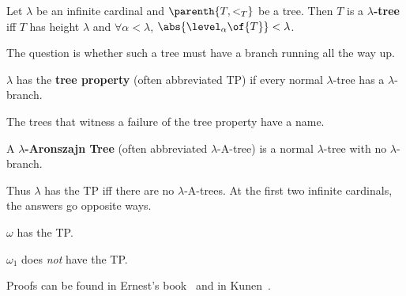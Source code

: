 

\begin{boxdefinition}
    Let $\lambda$ be an infinite cardinal and $\parenth{T, <_T}$ be a tree. Then $T$ is a \textbf{$\lambda$-tree} iff $T$ has height $\lambda$ and $\forall \alpha < \lambda$, $\abs{\level_{\alpha}\of{T}} < \lambda$.
\end{boxdefinition}

The question is whether such a tree must have a branch running all the way up.

\begin{boxdefinition}
    $\lambda$ has the \textbf{tree property} (often abbreviated TP) if every normal $\lambda$-tree has a $\lambda$-branch.
\end{boxdefinition}

The trees that witness a failure of the tree property have a name.

\begin{boxdefinition}
    A \textbf{$\lambda$-Aronszajn Tree} (often abbreviated $\lambda$-A-tree) is a normal $\lambda$-tree with no $\lambda$-branch.
\end{boxdefinition}

Thus $\lambda$ has the TP iff there are no $\lambda$-A-trees. At the first two infinite cardinals, the answers go opposite ways.

\begin{boxtheorem}[K\H{o}nig]
    $\omega$ has the TP.
\end{boxtheorem}

\begin{boxtheorem}[Aronszajn]
    $\omega_1$ does \textit{not} have the TP.
\end{boxtheorem}

Proofs can be found in Ernest's book~\cite[Theorems 5.17 and 5.30]{Schimmerling} and in Kunen~\cite[Chapter II, Lemma 5.7 and Theorem 5.9]{Kunen}.

